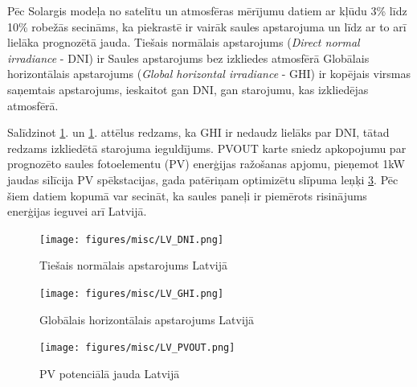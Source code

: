 
Pēc Solargis modeļa no satelītu un atmosfēras mērījumu datiem ar kļūdu 3\% līdz 10\% robežās secināms, ka piekrastē ir vairāk saules apstarojuma un līdz ar to arī lielāka prognozētā jauda. 
Tiešais normālais apstarojums (\textit{Direct normal irradiance} - DNI) ir Saules apstarojums bez izkliedes atmosfērā
Globālais horizontālais apstarojums (\textit{Global horizontal irradiance} - GHI) ir kopējais virsmas saņemtais apstarojums, ieskaitot gan DNI, gan starojumu, kas izkliedējas atmosfērā.

Salīdzinot \ref{fig:lv_DNI}. un  \ref{fig:lv_DNI}. attēlus redzams, ka GHI ir nedaudz lielāks par DNI, tātad redzams izkliedētā starojuma ieguldījums. PVOUT karte sniedz apkopojumu par prognozēto saules fotoelementu (PV) enerģijas ražošanas apjomu, pieņemot 1kW jaudas silīcija PV spēkstacijas, gada patēriņam optimizētu slīpuma leņķi \ref{fig:lv_PVOUT}. Pēc šiem datiem kopumā var secināt, ka saules paneļi ir piemērots risinājums enerģijas ieguvei arī Latvijā.


\begin{figure}[h]
    \centering
    \texttt{[image: figures/misc/LV\_DNI.png]}
    \caption{Tiešais normālais apstarojums Latvijā \cite{solargis}}
    \label{fig:lv_DNI}
\end{figure}
\begin{figure}[h]
    \centering
    \texttt{[image: figures/misc/LV\_GHI.png]}
    \caption{Globālais horizontālais apstarojums Latvijā \cite{solargis}}
    \label{fig:lv_GHI}
\end{figure}
\begin{figure}[h]
    \centering
    \texttt{[image: figures/misc/LV\_PVOUT.png]}
    \caption{PV potenciālā jauda Latvijā \cite{solargis}}
    \label{fig:lv_PVOUT}
\end{figure}
